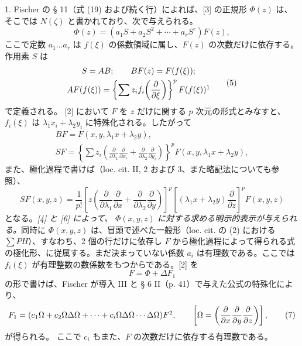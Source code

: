 \documentclass[11pt]{article}
\providecommand{\p}{\partial}
\begin{document}
1. Fischer の § 11（式 (19) および続く行）によれば、[3] の正規形 \(\Phi(z)\) は、そこでは \(N(\zeta)\) と書かれており、次で与えられる。
\begin{equation}
        \Phi(z)=(a_1S+a_2S^2+\cdots+a_rS^r)F(z),
\tag{4}
\end{equation}
ここで定数 \(a_1\ldots a_r\) は \(f(\xi)\) の係数領域に属し、\(F(z)\) の次数だけに依存する。作用素 \(S\) は
\begin{equation}
\begin{gathered}
        S=AB;\qquad BF(z)=F(f(\xi));\\
        AF(f(\xi))=\left\{\sum z_i f_i\!\left(\frac{\p}{\p\xi}\right)\right\}^{p}F(f(\xi))\footnotemark
\end{gathered}
\tag{5}
\end{equation}
で定義される。
[2] において \(F\) を \(z\) だけに関する \(p\) 次元の形式とみなすと、\(f_i(\xi)\) は \(\lambda_1x_i+\lambda_2y_i\) に特殊化される。したがって
\[
\begin{gathered}
        BF=F(x,y,\lambda_1x+\lambda_2y),\\
        SF=\left\{\sum z_i\left(\frac{\p}{\p\lambda_1}\frac{\p}{\p x_i}+
        \frac{\p}{\p\lambda_2}\frac{\p}{\p y_i}\right)\right\}^{p}
        F(x,y,\lambda_1x+\lambda_2y),
\end{gathered}
\]
また、極化過程で書けば（loc. cit. II, 2 および 3、また略記法についても参照）、
\begin{equation}
        SF(x,y,z)=\frac1{p!}\left[z\left(\frac{\p}{\p\lambda_1}\frac{\p}{\p x}+
        \frac{\p}{\p\lambda_2}\frac{\p}{\p y}\right)\right]^p
        \left[(\lambda_1x+\lambda_2y)\frac{\p}{\p z}\right]^p F(x,y,z)
\tag{6}
\end{equation}
となる。\emph{[4] と [6] によって、} \(\Phi(x,y,z)\) \emph{に対する求める明示的表示が与えられる。}同時に \(\Phi(x,y,z)\) は、冒頭で述べた一般形（loc. cit. の (2) における \(\sum PH\)）、すなわち、2 個の行だけに依存し \(F\) から極化過程によって得られる式の極化形、に従属する。まだ決まっていない係数 \(a_i\) は有理数である。ここでは \(f_i(\xi)\) が有理整数の数係数をもつからである。[2] を
\begin{equation}
        F=\Phi+\Delta F_1
\tag{2a}
\end{equation}
の形で書けば、Fischer が導入 III と § 6 II（p. 41）で与えた公式の特殊化により、
\begin{equation}
        F_1=(c_1\Omega+c_2\Omega\Delta\Omega+\cdots+c_i\Omega\Delta\Omega\cdots\Delta\Omega)F\footnotemark,
        \qquad \left[\Omega=\left(\frac{\p}{\p x}\frac{\p}{\p y}\frac{\p}{\p z}\right)\right],
\tag{7}
\end{equation}
が得られる。
ここで \(c_i\) もまた、\(F\) の次数だけに依存する有理数である。
\end{document}
